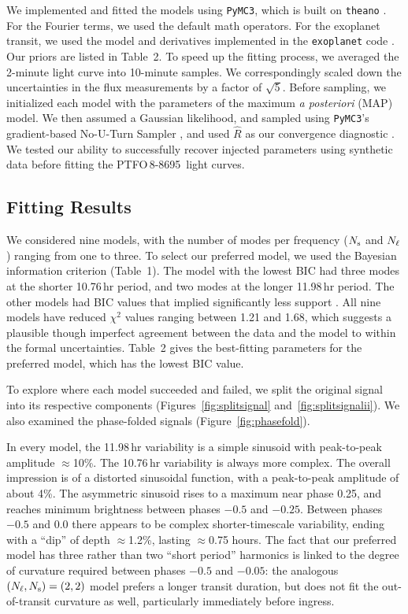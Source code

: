 \documentclass[12pt,twocolumn,tighten]{aastex62}
\newcommand{\ptfo}{PTFO$\,$8-8695}
\begin{document}
We implemented and fitted the models using \texttt{PyMC3}, which is
built on \texttt{theano}
\citep{salvatier_2016_PyMC3,exoplanet:theano}.  For the Fourier terms,
we used the default math operators.  For the exoplanet transit, we
used the model and derivatives implemented in the \texttt{exoplanet}
code \citep{exoplanet:exoplanet}.  Our priors are listed in Table~2.
To speed up the fitting process, we averaged the 2-minute light curve
into 10-minute samples.  We correspondingly scaled down the
uncertainties in the flux measurements by a factor of $\sqrt{5}$.
Before sampling, we initialized each model with the parameters of the
maximum {\it a posteriori} (MAP) model.  We then assumed a Gaussian
likelihood, and sampled using \texttt{PyMC3}'s gradient-based
No-U-Turn Sampler \citep{hoffman_no-u-turn_2014}, and used $\hat{R}$
as our convergence diagnostic \citep{gelman_inference_1992}.  We
tested our ability to successfully recover injected parameters using
synthetic data before fitting the \ptfo\ light curves.


\subsection{Fitting Results}

We considered nine models, with the number of modes per frequency
($N_{\rm s}$ and $N_{\rm \ell}$) ranging from one to three.  To select
our preferred model, we used the Bayesian information criterion
(Table~1).  The model with the lowest BIC had three modes at the
shorter 10.76$\,$hr period, and two modes at the longer 11.98$\,$hr
period.  The other models had BIC values that implied significantly
less support \citep{burnham_multimodel_2016}.  All nine models have
reduced $\chi^2$ values ranging between 1.21 and 1.68, which suggests
a plausible though imperfect agreement between the data and the model
to within the formal uncertainties.  Table~2 gives the best-fitting
parameters for the preferred model, which has the lowest BIC value.

To explore where each model succeeded and failed, we split the
original signal into its respective components
(Figures~\ref{fig:splitsignal} and~\ref{fig:splitsignalii}).  We also
examined the phase-folded signals (Figure~\ref{fig:phasefold}).  

In every model, the 11.98$\,$hr variability is a simple sinusoid with
peak-to-peak amplitude $\approx$10\%.  The 10.76$\,$hr variability is
always more complex.  The overall impression is of a distorted
sinusoidal function, with a peak-to-peak amplitude of about 4\%.  The
asymmetric sinusoid rises to a maximum near phase 0.25, and reaches
minimum brightness between phases $-0.5$ and $-0.25$.  Between phases
$-0.5$ and $0.0$ there appears to be complex shorter-timescale
variability, ending with a ``dip'' of depth $\approx$1.2\%, lasting
$\approx$0.75 hours.  The fact that our preferred model has three
rather than two ``short period'' harmonics is linked to the degree of
curvature required between phases $-0.5$ and $-0.05$: the analogous
$(N_{\rm \ell},N_{\rm s})=(2,2)$ model prefers a longer transit
duration, but does not fit the out-of-transit curvature as well,
particularly immediately before ingress.
\end{document}
